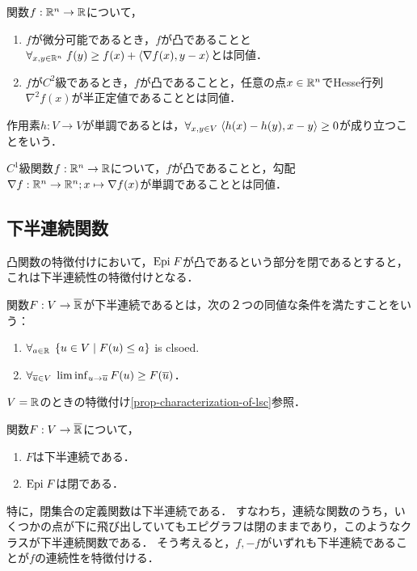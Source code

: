 \documentclass[uplatex,dvipdfmx]{jsreport}
\begin{document}
\begin{corollary}
    関数$f:\mathbb{R}^n\to\mathbb{R}$について，
    \begin{enumerate}
        \item $f$が微分可能であるとき，$f$が凸であることと$\forall_{x,y\in\mathbb{R}^n}\;f(y)\ge f(x)+\langle\nabla f(x),y-x\rangle$とは同値．
        \item $f$が$C^2$級であるとき，$f$が凸であることと，任意の点$x\in\mathbb{R}^n$でHesse行列$\nabla^2f(x)$が半正定値であることとは同値．
    \end{enumerate}
\end{corollary}

\begin{definition}
    作用素$h:V\to V$が単調であるとは，$\forall_{x,y\in V}\;\langle h(x)-h(y),x-y\rangle\ge0$が成り立つことをいう．
\end{definition}

\begin{proposition}
    $C^1$級関数$f:\mathbb{R}^n\to\mathbb{R}$について，$f$が凸であることと，勾配$\nabla f:\mathbb{R}^n\to\mathbb{R}^n;x\mapsto\nabla f(x)$が単調であることとは同値．
\end{proposition}

\subsection{下半連続関数}

\begin{tcolorbox}[colframe=ForestGreen, colback=ForestGreen!10!white,breakable,colbacktitle=ForestGreen!40!white,coltitle=black,fonttitle=\bfseries\sffamily,
title=]
    凸関数の特徴付けにおいて，$\mathrm{Epi}\; F$が凸であるという部分を閉であるとすると，これは下半連続性の特徴付けとなる．
\end{tcolorbox}

\begin{definition}
    関数$F:V\to\overline{\mathbb{R}}$が下半連続であるとは，次の２つの同値な条件を満たすことをいう：
    \begin{enumerate}
        \item $\forall_{a\in\mathbb{R}}\;\left\{u\in V\mid F(u)\le a\right\}$ is clsoed.
        \item $\forall_{\overline{u}\in V}\;\liminf_{u\to\overline{u}}F(u)\ge F(\overline{u})$．
    \end{enumerate}
    $V=\mathbb{R}$のときの特徴付け\ref{prop-characterization-of-lsc}参照．
\end{definition}

\begin{proposition}[下半連続関数の特徴付け]
    関数$F:V\to\overline{\mathbb{R}}$について，
    \begin{enumerate}
        \item $F$は下半連続である．
        \item $\mathrm{Epi}\; F$は閉である．
    \end{enumerate}
\end{proposition}
\begin{remarks}
    特に，閉集合の定義関数は下半連続である．
    すなわち，連続な関数のうち，いくつかの点が下に飛び出していてもエピグラフは閉のままであり，このようなクラスが下半連続関数である．
    そう考えると，$f,-f$がいずれも下半連続であることが$f$の連続性を特徴付ける．
\end{remarks}
\end{document}
